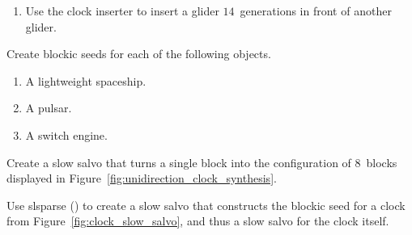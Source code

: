 \begin{multicols}{2}
\begin{problemstar}
\begin{enumerate}[label=\bf\color{ocre}(\alph*)]
			
			\item Use the clock inserter to insert a glider $14$~generations in front of another glider.
		\end{enumerate}
	\end{problemstar}
	
	
	\mfilbreak
	
	
	\begin{problem}\label{exer:other_blockic}
		Create blockic seeds for each of the following objects.
		
		\begin{enumerate}[label=\bf\color{ocre}(\alph*)]
			\item A lightweight spaceship.
			
			\item A pulsar.
			
			\item A switch engine.
		\end{enumerate}
	\end{problem}
	
	
	\mfilbreak
	
	
	\begin{problem}\label{exer:create_clock_turners}
		Create a slow salvo that turns a single block into the configuration of $8$~blocks displayed in Figure~\ref{fig:unidirection_clock_synthesis}.
		
	\end{problem}
	
	
	\mfilbreak
	
	
	\begin{problem}\label{exer:create_clock_turners_nonsync}
		Use slsparse () to create a slow salvo that constructs the blockic seed for a clock from Figure~\ref{fig:clock_slow_salvo}, and thus a slow salvo for the clock itself.
	\end{problem}
	
	
	\mfilbreak
	

\end{multicols}
